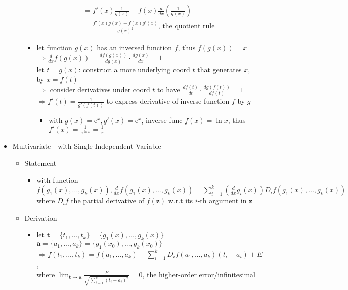 \begin{itemize}
\begin{itemize}
\begin{itemize}
\begin{align*}
		&= f'(x)\frac{1}{g(x)} + f(x)\frac{d}{dx}\left(\frac{1}{g(x)}\right) \\
		&= \frac{f'(x)g(x) - f(x)g'(x)}{g(x)^2} \text{, the quotient rule}\end{align*}
		\item let function $g(x)$ has an inversed function $f$, thus $f(g(x))=x$ \\
		$\Rightarrow \frac{d}{dx}f(g(x)) = \frac{df(g(x))}{dg(x)}\cdot \frac{dg(x)}{dx} = 1$ \\
		let $t=g(x)$: construct a more underlying coord $t$ that generates $x$, by $x=f(t)$ \\
		$\Rightarrow$ consider derivatives under coord $t$ to have $\frac{df(t)}{dt}\cdot \frac{dg(f(t))}{df(t)}=1$ \\
		$\Rightarrow f'(t) = \frac{1}{g'(f(t))}$ to express derivative of inverse function $f$ by $g$
			\begin{itemize}
			\item with $g(x)=\mathrm e^x, g'(x)=\mathrm e^x$, inverse func $f(x)=\ln x$, thus $f'(x)=\frac{1}{e^{\ln x}} = \frac 1 x$
			\end{itemize}
		\end{itemize}
	\end{itemize}
\item Multivariate - with Single Independent Variable
	\begin{itemize}
	\item Statement
		\begin{itemize}
		\item with function $f(g_1(x), ..., g_k(x)), \frac{d}{dx}f(g_1(x), ..., g_k(x))=\sum_{i=1}^k \left( \frac{d}{dx}g_i(x) \right)D_i f(g_1(x), ..., g_k(x))$ \\
		where $D_if$ the partial derivative of $f(\mathbf z)$ w.r.t its $i$-th argument in $\mathbf z$
		\end{itemize}
	\item Derivation
		\begin{itemize}
		\item let $\mathbf t=\{t_1,...,t_k\} = \{g_1(x), ..., g_k(x)\}$ \\
		\phantom{let} $\mathbf a = \{a_1,...,a_k\} = \{g_1(x_0), ...,g_k(x_0)\}$ \\
		$\displaystyle \Rightarrow f(t_1,...,t_k)=f(a_1,...,a_k)+\sum_{i=1}^k D_if(a_1,...,a_k)(t_i-a_i) + E$, \\
		where ${\displaystyle \lim_{\mathbf t\rightarrow \mathbf a}} \frac{E}{\sqrt{\sum_{i=1}^k (t_i-a_i)^2}} = 0$, the higher-order error/infinitesimal \\

\end{itemize}
\end{itemize}
\end{itemize}
